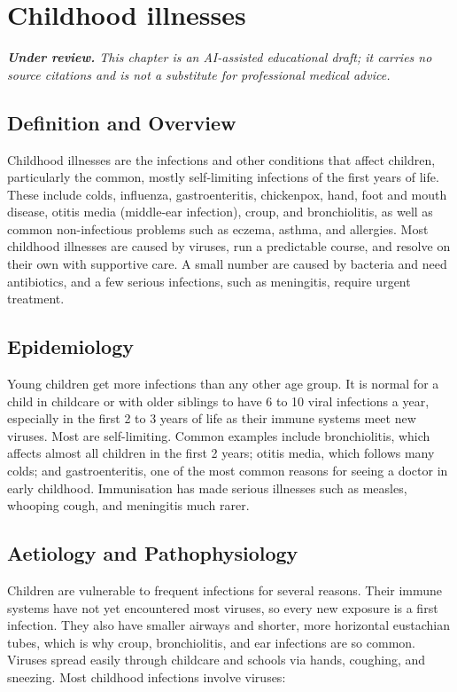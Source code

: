 \chapter{Childhood illnesses}

\medskip
\noindent\textit{\textbf{Under review.} This chapter is an AI-assisted educational draft; it carries no source citations and is not a substitute for professional medical advice.}

\section*{Definition and Overview}
Childhood illnesses are the infections and other conditions that affect children, particularly the common, mostly self-limiting infections of the first years of life. These include colds, influenza, gastroenteritis, chickenpox, hand, foot and mouth disease, otitis media (middle-ear infection), croup, and bronchiolitis, as well as common non-infectious problems such as eczema, asthma, and allergies. Most childhood illnesses are caused by viruses, run a predictable course, and resolve on their own with supportive care. A small number are caused by bacteria and need antibiotics, and a few serious infections, such as meningitis, require urgent treatment.

\section*{Epidemiology}
Young children get more infections than any other age group. It is normal for a child in childcare or with older siblings to have 6 to 10 viral infections a year, especially in the first 2 to 3 years of life as their immune systems meet new viruses. Most are self-limiting. Common examples include bronchiolitis, which affects almost all children in the first 2 years; otitis media, which follows many colds; and gastroenteritis, one of the most common reasons for seeing a doctor in early childhood. Immunisation has made serious illnesses such as measles, whooping cough, and meningitis much rarer.

\section*{Aetiology and Pathophysiology}
Children are vulnerable to frequent infections for several reasons. Their immune systems have not yet encountered most viruses, so every new exposure is a first infection. They also have smaller airways and shorter, more horizontal eustachian tubes, which is why croup, bronchiolitis, and ear infections are so common. Viruses spread easily through childcare and schools via hands, coughing, and sneezing. Most childhood infections involve viruses:

